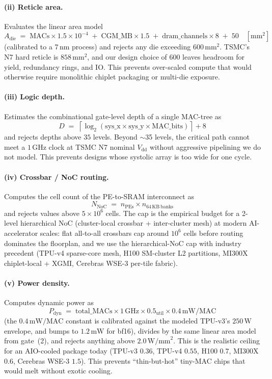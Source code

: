 \paragraph{(ii) Reticle area.}
Evaluates the linear area model
\[ A_{\mathrm{die}} \;=\; \mathrm{MACs} \times 1.5 \times 10^{-4} \;+\; \mathrm{CGM\_MB} \times 1.5 \;+\; \mathrm{dram\_channels} \times 8 \;+\; 50 \quad [\mathrm{mm}^2] \]
(calibrated to a 7\,nm process) and rejects any die exceeding $600\,\mathrm{mm}^2$.
TSMC's N7 hard reticle is $858\,\mathrm{mm}^2$, and our design choice of 600 leaves headroom for yield, redundancy rings, and IO.
This prevents over-scaled compute that would otherwise require monolithic chiplet packaging or multi-die exposure.

\paragraph{(iii) Logic depth.}
Estimates the combinational gate-level depth of a single MAC-tree as
\[ D \;=\; \left\lceil \log_2(\mathrm{sys\_x} \times \mathrm{sys\_y} \times \mathrm{MAC\_bits}) \right\rceil + 8 \]
and rejects depths above $35$ levels.
Beyond $\sim$35 levels, the critical path cannot meet a $1\,\mathrm{GHz}$ clock at TSMC N7 nominal $V_{\mathrm{dd}}$ without aggressive pipelining we do not model.
This prevents designs whose systolic array is too wide for one cycle.

\paragraph{(iv) Crossbar / NoC routing.}
Computes the cell count of the PE-to-SRAM interconnect as
\[ N_{\mathrm{NoC}} \;=\; n_{\mathrm{PEs}} \times n_{64\,\mathrm{KB\ banks}} \]
and rejects values above $5 \times 10^6$ cells.
The cap is the empirical budget for a 2-level hierarchical NoC (cluster-local crossbar + inter-cluster mesh) at modern AI-accelerator scales: flat all-to-all crossbars cap around $10^6$ cells before routing dominates the floorplan, and we use the hierarchical-NoC cap with industry precedent (TPU-v4 sparse-core mesh, H100 SM-cluster L2 partitions, MI300X chiplet-local + XGMI, Cerebras WSE-3 per-tile fabric).

\paragraph{(v) Power density.}
Computes dynamic power as
\[ P_{\mathrm{dyn}} \;=\; \mathrm{total\_MACs} \times 1\,\mathrm{GHz} \times 0.5_{\mathrm{util}} \times 0.4\,\mathrm{mW/MAC} \]
(the $0.4\,\mathrm{mW/MAC}$ constant is calibrated against the modeled TPU-v3's $250\,\mathrm{W}$ envelope, and bumps to $1.2\,\mathrm{mW}$ for bf16), divides by the same linear area model from gate~(2), and rejects anything above $2.0\,\mathrm{W/mm}^2$.
This is the realistic ceiling for an AIO-cooled package today (TPU-v3 $0.36$, TPU-v4 $0.55$, H100 $0.7$, MI300X $0.6$, Cerebras WSE-3 $1.5$).
This prevents ``thin-but-hot'' tiny-MAC chips that would melt without exotic cooling.

